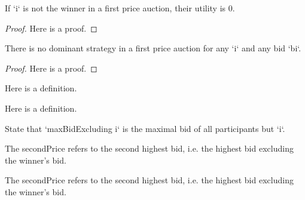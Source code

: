 \begin{lemma}\label{FirstPrice.utility_loser}
    \leanok
    If `i` is not the winner in a first price auction, their utility is 0.
\end{lemma}
\begin{proof}
    Here is a proof.
\end{proof}

\begin{theorem}\label{FirstPrice.firstprice_auction_has_no_dominant_strategy}
    \leanok
    There is no dominant strategy in a first price auction for any `i` and any bid `bi`.
\end{theorem}
\begin{proof}
    Here is a proof.
\end{proof}

\begin{definition}\label{Finset.univ_nontrivial_iff}
     \leanok
      \uses{}
     Here is a definition.
 \end{definition}

 \begin{definition}\label{Finset.univ_nontrivial}
     \leanok
      \uses{}
     Here is a definition.
 \end{definition}


\begin{definition}\label{maxBidExcluding}
    \leanok
    State that `maxBidExcluding i` is the maximal bid of all participants but `i`.
\end{definition}

\begin{definition}\label{secondPrice}
    \leanok
    The secondPrice refers to the second highest bid, i.e. the highest bid excluding the winner’s bid.
\end{definition}

\begin{definition}\label{winnerbid_ge_second}
    \leanok
    The secondPrice refers to the second highest bid, i.e. the highest bid excluding the winner’s bid.
\end{definition}

